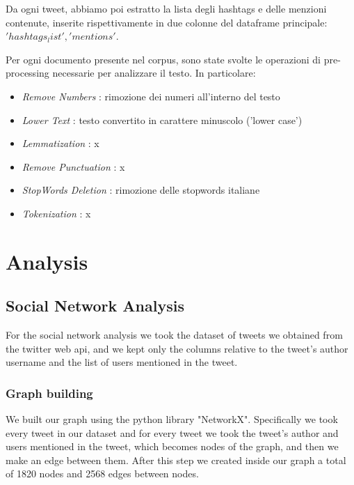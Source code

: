 \documentclass[12pt,journal,compsoc]{IEEEtran}
\begin{document}
Da ogni tweet, abbiamo poi estratto la lista degli hashtags e delle menzioni contenute, inserite rispettivamente in due colonne del dataframe principale: $'hashtags_list', 'mentions'$.

Per ogni documento presente nel corpus, sono state svolte le operazioni di pre-processing necessarie per analizzare il testo. In particolare:

\begin{itemize}
	\item \textit{Remove Numbers} : rimozione dei numeri all'interno del testo
	\item \textit{Lower Text} : testo convertito in carattere minuscolo ('lower case')
	\item \textit{Lemmatization} : x
	\item \textit{Remove Punctuation} : x
	\item \textit{StopWords Deletion} : rimozione delle stopwords italiane
	\item \textit{Tokenization} : x
\end{itemize}

\section{Analysis}
\subsection{Social Network Analysis}
For the social network analysis we took the dataset of tweets we obtained from the twitter web api, and we kept only the columns relative to the tweet's author username and the list of users mentioned in the tweet. 
\subsubsection{Graph building}
We built our graph using the python library "NetworkX". Specifically we took every tweet in our dataset and for every tweet we took the tweet's author and users mentioned in the tweet, which becomes nodes of the graph, and then we make an edge between them. After this step we created inside our graph a total of 1820 nodes and 2568 edges between nodes.
\end{document}
